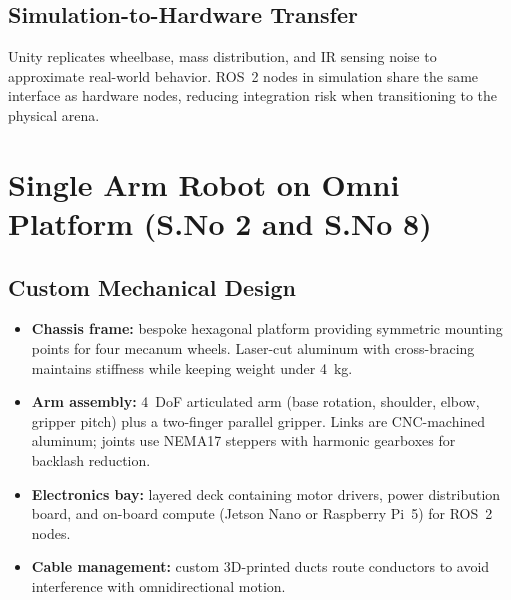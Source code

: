 \documentclass[12pt]{article}
\begin{document}
\subsection{Simulation-to-Hardware Transfer}
Unity replicates wheelbase, mass distribution, and IR sensing noise to approximate real-world behavior. ROS~2 nodes in simulation share the same interface as hardware nodes, reducing integration risk when transitioning to the physical arena.

\section{Single Arm Robot on Omni Platform (S.No 2 and S.No 8)}\label{sec:sarm}
\subsection{Custom Mechanical Design}
\begin{itemize}
    \item \textbf{Chassis frame:} bespoke hexagonal platform providing symmetric mounting points for four mecanum wheels. Laser-cut aluminum with cross-bracing maintains stiffness while keeping weight under 4~kg.
    \item \textbf{Arm assembly:} 4~DoF articulated arm (base rotation, shoulder, elbow, gripper pitch) plus a two-finger parallel gripper. Links are CNC-machined aluminum; joints use NEMA17 steppers with harmonic gearboxes for backlash reduction.
    \item \textbf{Electronics bay:} layered deck containing motor drivers, power distribution board, and on-board compute (Jetson Nano or Raspberry Pi~5) for ROS~2 nodes.
    \item \textbf{Cable management:} custom 3D-printed ducts route conductors to avoid interference with omnidirectional motion.
\end{itemize}
\end{document}
